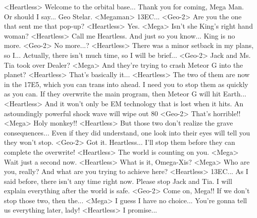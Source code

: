 <Heartless> Welcome to the orbital base... 
Thank you for coming, Mega Man. 
Or should I say... Geo Stelar. 
<Megaman> {13}{EC}... 
<Geo-2> Are you the one that sent me that pop-up? 
<Heartless> Yes. 
<Mega> Isn't she King's right hand woman? 
<Heartless> Call me Heartless. 
And just so you know... King is no more. 
<Geo-2> No more...? 
<Heartless> There was a minor setback in my plans, so I... 
Actually, there isn't much time, so I will be brief... 
<Geo-2> Jack and Ms. Tia took over Dealer? 
<Mega> And they're trying to crash Meteor G into the planet? 
<Heartless> That's basically it... 
<Heartless> The two of them are now in the {17}{E5}, which you can trans into ahead. 
I need you to stop them as quickly as you can. 
If they overwrite the main program, then Meteor G will hit Earth... 
<Heartless> And it won't only be EM technology that is lost when it hits. 
An astoundingly powerful shock wave will wipe out 80%
<Geo-2> That's horrible!! 
<Mega> Holy monkey!! 
<Heartless> But those two don't realize the grave consequences... 
Even if they did understand, one look into their eyes will tell you they won't stop. 
<Geo-2> Got it. 
Heartless... 
I'll stop them before they can complete the overwrite! 
<Heartless> The world is counting on you. 
<Mega> Wait just a second now. 
<Heartless> What is it, Omega-Xis? 
<Mega> Who are you, really? 
And what are you trying to achieve here? 
<Heartless> {13}{EC}... 
As I said before, there isn't any time right now. 
Please stop Jack and Tia. 
I will explain everything after the world is safe. 
<Geo-2> Come on, Mega!! If we don't stop those two, then the... 
<Mega> I guess I have no choice... You're gonna tell us everything later, lady! 
<Heartless> I promise... 
